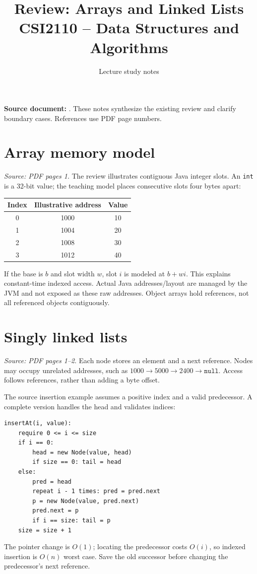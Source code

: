 \documentclass[11pt,letterpaper]{article}
\title{\textbf{Review: Arrays and Linked Lists}\\\large CSI2110 -- Data Structures and Algorithms}\author{Lecture study notes}\date{}
\newcommand{\sourcepages}[1]{\textit{Source: PDF pages #1.}}
\newcommand{\method}[1]{\texttt{#1}}
\begin{document}
\maketitle
\textbf{Source document:} . These notes synthesize the existing review and clarify boundary cases. References use PDF page numbers.
\tableofcontents\newpage

\section{Array memory model}
\sourcepages{1}
The review illustrates contiguous Java integer slots. An \method{int} is a 32-bit value; the teaching model places consecutive slots four bytes apart:
\begin{center}\begin{tabular}{@{}ccc@{}}\toprule
Index & Illustrative address & Value\\\midrule
0 & 1000 & 10\\1 & 1004 & 20\\2 & 1008 & 30\\3 & 1012 & 40\\\bottomrule
\end{tabular}\end{center}
If the base is $b$ and slot width $w$, slot $i$ is modeled at $b+wi$. This explains constant-time indexed access. Actual Java addresses/layout are managed by the JVM and not exposed as these raw addresses. Object arrays hold references, not all referenced objects contiguously.

\section{Singly linked lists}
\sourcepages{1--2}
Each node stores an element and a next reference. Nodes may occupy unrelated addresses, such as $1000\to5000\to2400\to\method{null}$. Access follows references, rather than adding a byte offset.

The source insertion example assumes a positive index and a valid predecessor. A complete version handles the head and validates indices:
\par\noindent\begin{minipage}{\linewidth}
\begin{lstlisting}
insertAt(i, value):
    require 0 <= i <= size
    if i == 0:
        head = new Node(value, head)
        if size == 0: tail = head
    else:
        pred = head
        repeat i - 1 times: pred = pred.next
        p = new Node(value, pred.next)
        pred.next = p
        if i == size: tail = p
    size = size + 1
\end{lstlisting}
\end{minipage}\par
The pointer change is $O(1)$; locating the predecessor costs $O(i)$, so indexed insertion is $O(n)$ worst case. Save the old successor before changing the predecessor's next reference.
\end{document}
